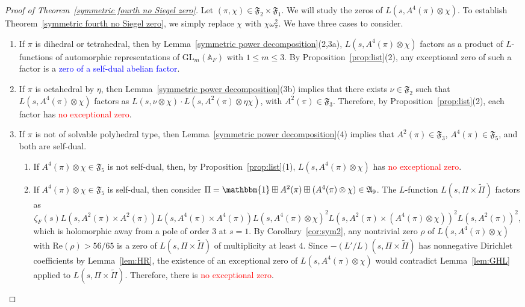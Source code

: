 \documentclass[11pt]{amsart}
\theoremstyle{remark}
\newcommand{\GL}{\mathrm{GL}}
\newcommand{\re}{\mathrm{Re}}
\renewcommand{\tilde}{\widetilde}
\numberwithin{equation}{section}
\begin{document}
\begin{proof}[Proof of Theorem~\ref{symmetric fourth no Siegel zero}]

Let $(\pi,\chi)\in\mathfrak{F}_2\times\mathfrak{F}_1$.  We will study the zeros of $L(s,A^4(\pi)\otimes\chi)$.  To establish Theorem~\ref{symmetric fourth no Siegel zero}, we simply replace $\chi$ with $\chi\omega_{\pi}^2$.  We have three cases to consider.
\begin{enumerate}
    \item If $\pi$ is dihedral or tetrahedral, then by Lemma~\ref{symmetric power decomposition}(2,3a), $L(s,A^4(\pi) \otimes \chi)$ factors as a product of $L$-functions of automorphic representations of $\GL_m(\mathbb{A}_F)$ with $1 \leq m \leq 3$.  By Proposition~\ref{prop:list}(2), any exceptional zero of such a factor is a \textcolor{blue}{zero of a self-dual abelian factor}.
    \item If $\pi$ is octahedral by $\eta$, then Lemma~\ref{symmetric power decomposition}(3b) implies that there exists $\nu\in\mathfrak{F}_2$ such that $L(s,A^4(\pi) \otimes \chi)$ factors as $L(s,\nu \otimes \chi) \cdot L(s,A^2(\pi) \otimes \eta\chi)$, with $A^2(\pi)\in\mathfrak{F}_3$.  Therefore, by Proposition~\ref{prop:list}(2), each factor has \textcolor{red}{no exceptional zero}.
    \item If $\pi$ is not of solvable polyhedral type, then Lemma~\ref{symmetric power decomposition}(4) implies that $A^2(\pi)\in\mathfrak{F}_3$, $A^4(\pi)\in\mathfrak{F}_5$, and both are self-dual.
    \begin{enumerate}
    \item If $A^4(\pi)\otimes\chi\in\mathfrak{F}_5$ is not self-dual, then, by Proposition~\ref{prop:list}(1), $L(s,A^4(\pi)\otimes\chi)$ has \textcolor{red}{no exceptional zero}.
    \item If $A^4(\pi)\otimes\chi\in\mathfrak{F}_5$ is self-dual, then consider $\Pi = \mathbbm{1} \boxplus A^2(\pi) \boxplus (A^4(\pi) \otimes \chi)\in\mathfrak{A}_9$.  The $L$-function $L(s,\Pi\times\tilde{\Pi})$ factors as
    \[
    \zeta_F(s) L(s,A^2(\pi) \times A^2(\pi)) L(s,A^4(\pi) \times A^4(\pi)) L(s,A^4(\pi)\otimes\chi)^2 L(s,A^2(\pi) \times (A^4(\pi) \otimes \chi))^2 L(s,A^2(\pi))^2,
    \]
    which is holomorphic away from a pole of order $3$ at $s=1$.  By Corollary~\ref{cor:sym2}, any nontrivial zero $\rho$ of $L(s,A^4(\pi)\otimes\chi)$ with $\re(\rho)>56/65$ is a zero of $L(s,\Pi\times\tilde{\Pi})$ of multiplicity at least $4$.   Since $-(L'/L)(s,\Pi\times\tilde{\Pi})$ has nonnegative Dirichlet coefficients by Lemma~\ref{lem:HR}, the existence of an exceptional zero of $L(s,A^4(\pi)\otimes\chi)$ would contradict Lemma~\ref{lem:GHL} applied to $L(s,\Pi\times\tilde{\Pi})$.  Therefore, there is \textcolor{red}{no exceptional zero}.\qedhere
    \end{enumerate}
\end{enumerate}


\end{proof}
\end{document}
